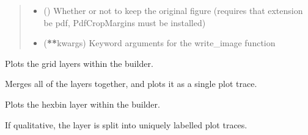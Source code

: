 \documentclass[letterpaper,10pt,english]{sphinxmanual}
\begin{document}
\begin{fulllineitems}
\begin{fulllineitems}
\begin{quote}
\begin{description}
\begin{itemize}
\item {} 
\sphinxAtStartPar
{} () \textendash{} Whether or not to keep the original figure (requires that extension be pdf, PdfCropMargins must be installed)

\item {} 
\sphinxAtStartPar
{} ({\color{red}\bfseries{}**}kwargs) \textendash{} Keyword arguments for the write\_image function

\end{itemize}

\end{description}\end{quote}

\end{fulllineitems}


\begin{fulllineitems}
\label{\detokenize{builder:geohexviz.builder.PlotBuilder.plot_grids}}
\sphinxAtStartPar
Plots the grid layers within the builder.

\sphinxAtStartPar
Merges all of the layers together, and plots it as a single plot trace.

\end{fulllineitems}


\begin{fulllineitems}
\label{\detokenize{builder:geohexviz.builder.PlotBuilder.plot_hexbin}}
\sphinxAtStartPar
Plots the hexbin layer within the builder.

\sphinxAtStartPar
If qualitative, the layer is split into uniquely labelled plot traces.

\end{fulllineitems}



\end{fulllineitems}
\end{document}
